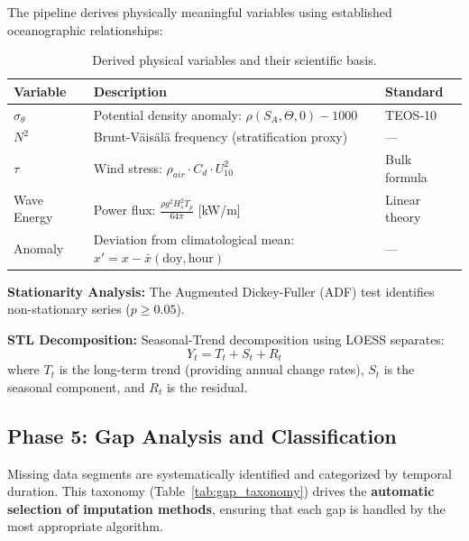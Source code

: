 \documentclass[12pt,a4paper]{article}
\begin{document}
The pipeline derives physically meaningful variables using established oceanographic relationships:

\begin{table}[H]
\centering
\caption{Derived physical variables and their scientific basis.}
\label{tab:derived_vars}
\begin{tabularx}{\textwidth}{@{}lXl@{}}
\toprule
\textbf{Variable} & \textbf{Description} & \textbf{Standard} \\ \midrule
$\sigma_\theta$ & Potential density anomaly: $\rho(S_A, \Theta, 0) - 1000$ & TEOS-10 \\
$N^2$ & Brunt-Väisälä frequency (stratification proxy) & — \\
$\tau$ & Wind stress: $\rho_{air} \cdot C_d \cdot U_{10}^2$ & Bulk formula \\
Wave Energy & Power flux: $\frac{\rho g^2 H_s^2 T_p}{64\pi}$ [kW/m] & Linear theory \\
Anomaly & Deviation from climatological mean: $x' = x - \bar{x}(\text{doy}, \text{hour})$ & — \\
\bottomrule
\end{tabularx}
\end{table}

\textbf{Stationarity Analysis:} The Augmented Dickey-Fuller (ADF) test identifies non-stationary series ($p \geq 0.05$).

\textbf{STL Decomposition:} Seasonal-Trend decomposition using LOESS separates:
\begin{equation}
    Y_t = T_t + S_t + R_t
\end{equation}
where $T_t$ is the long-term trend (providing annual change rates), $S_t$ is the seasonal component, and $R_t$ is the residual.

\newpage
\subsection{Phase 5: Gap Analysis and Classification}
\label{sec:gap_analysis}

Missing data segments are systematically identified and categorized by temporal duration. This taxonomy (Table~\ref{tab:gap_taxonomy}) drives the \textbf{automatic selection of imputation methods}, ensuring that each gap is handled by the most appropriate algorithm.
\end{document}
